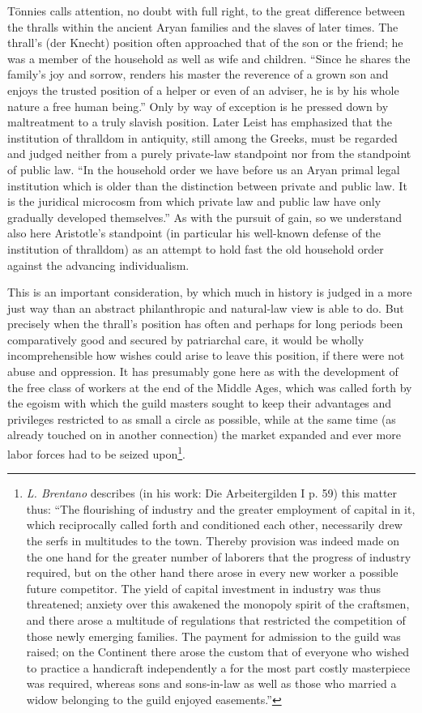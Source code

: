 \documentclass[12pt,a4paper,openany]{book}
\newcommand{\opage}[1]{\marginnote{\footnotesize\textit{[#1]}}}
\begin{document}
Tönnies calls attention, no doubt with full right, to the
great difference between the thralls within the ancient Aryan
families and the slaves of later times. The thrall's (der Knecht)
position often approached that of the son or the friend; he was
a member of the household as well as wife and children. ``Since
he shares the family's joy and sorrow, renders his master
the reverence of a grown son and enjoys the trusted position of a helper or even of an
adviser, he is by his whole
nature a free human being.'' Only by way of exception is he pressed down by
maltreatment to a truly slavish position. Later
Leist has emphasized that the institution of thralldom in antiquity, still among the
Greeks, must be regarded and judged neither from a purely
private-law standpoint nor from the standpoint of public
law. ``In the household order we have before us an Aryan primal legal institution
which is older than the distinction between private and public
law. It is the juridical microcosm from which
private law and public law have only gradually developed
themselves.'' As with the pursuit of gain, so we understand
also here Aristotle's standpoint (in particular his well-known
defense of the institution of thralldom) as an attempt to
hold fast the old household order against the advancing
individualism.

This is an important consideration, by which much in
history is judged in a more just way than an abstract
philanthropic and natural-law view is able to do. But
precisely when the thrall's position has often and perhaps for long periods
been comparatively good and secured by patriarchal
care, it would be wholly incomprehensible how wishes could
arise to leave this position, if there were not
abuse and oppression. It has presumably
gone here as with the development of the free class of workers
\opage{151}at the end of the Middle Ages, which was called forth by the
egoism with which the guild masters sought to keep their
advantages and privileges restricted to as small a circle as
possible, while at the same time (as already touched on in another
connection) the market expanded and ever more
labor forces had to be seized upon\footnote{\emph{L. Brentano} describes (in his work: Die Arbeitergilden I p. 59) this
matter thus: ``The flourishing of industry and the greater employment
of capital in it, which reciprocally called forth and conditioned each other,
necessarily drew the serfs in multitudes to the town. Thereby
provision was indeed made on the one hand for the greater number of laborers
that the progress of industry required, but on the other hand there arose
in every new worker a possible future competitor. The yield
of capital investment in industry was thus threatened; anxiety
over this awakened the monopoly spirit of the craftsmen, and there arose a multitude of
regulations that restricted the competition of those newly emerging families.
The payment for admission to the guild was raised; on the
Continent there arose the custom that of everyone who wished to practice
a handicraft independently a for the most part costly
masterpiece was required, whereas sons and sons-in-law as well as those who
married a widow belonging to the guild enjoyed
easements.''}.
\end{document}
